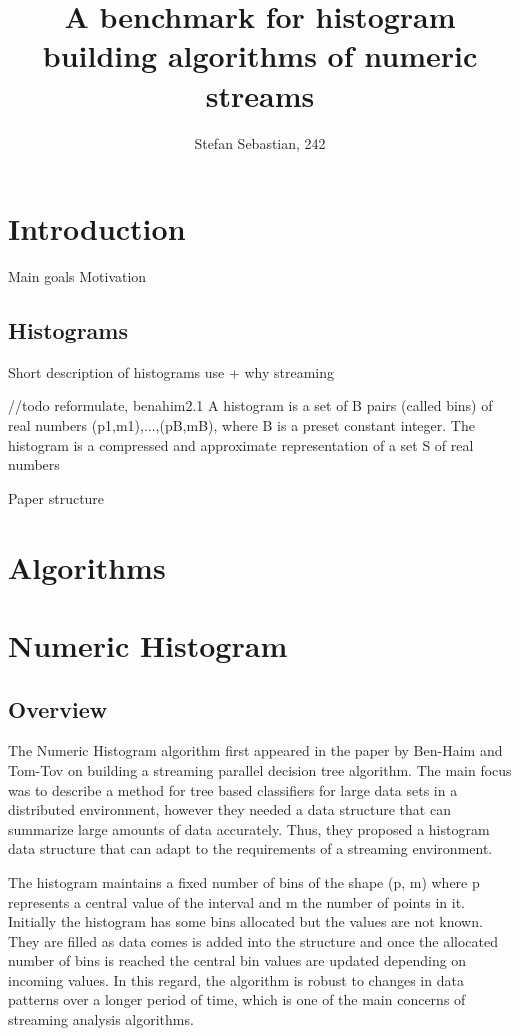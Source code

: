 \documentclass[12pt]{article}
\begin{document}
	\title{A benchmark for histogram building algorithms of numeric streams}
	\author{Stefan Sebastian, 242}
	\date{}
	\maketitle
	
	\newpage
	\tableofcontents
	\newpage

	\section{Introduction}
	Main goals 
	Motivation 

	\subsection{Histograms}
	Short description of histograms use + why streaming 
	
	//todo reformulate, benahim2.1 A histogram is a set of B pairs (called bins) of real numbers {(p1,m1),...,(pB,mB)}, where B is a
	preset constant integer. The histogram is a compressed and approximate representation of a set S
	of real numbers


	Paper structure

	\section{Algorithms}
	\section{Numeric Histogram}
	\subsection{Overview}
	The Numeric Histogram algorithm first appeared in the paper by Ben-Haim and Tom-Tov
	on building a streaming parallel decision tree algorithm\cite{Ben-Haim:2010:SPD:1756006.1756034}.
	The main focus was to describe a method for tree based classifiers for large data 
	sets in a distributed environment, however they needed a data structure that 
	can summarize large amounts of data accurately. Thus, they proposed a histogram 
	data structure that can adapt to the requirements of a streaming environment. 

	The histogram maintains a fixed number of bins of the shape (p, m) where 
	p represents a central value of the interval and m the number of points in it.
	Initially the histogram has some bins allocated but the values are not known. 
	They are filled as data comes is added into the structure and once the allocated 
	number of bins is reached the central bin values are updated depending on incoming
	values. In this regard, the algorithm is robust to changes in data patterns over 
	a longer period of time, which is one of the main concerns of streaming analysis 
	algorithms.
\end{document}
